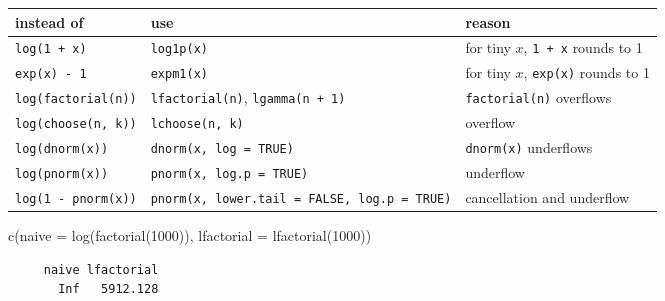 \documentclass[
  letterpaper,
  DIV=11,
  numbers=noendperiod]{scrreprt}
\newenvironment{Shaded}{\begin{snugshade}}{\end{snugshade}}
\newcommand{\AttributeTok}[1]{\textcolor[rgb]{0.40,0.45,0.13}{#1}}
\newcommand{\DecValTok}[1]{\textcolor[rgb]{0.68,0.00,0.00}{#1}}
\newcommand{\FunctionTok}[1]{\textcolor[rgb]{0.28,0.35,0.67}{#1}}
\newcommand{\NormalTok}[1]{\textcolor[rgb]{0.00,0.23,0.31}{#1}}
\newcounter{none} %
\begin{document}
{\def\LTcaptype{none} %
\begin{longtable}[]{@{}
  >{\raggedright\arraybackslash}p{}
  >{\raggedright\arraybackslash}p{}
  >{\raggedright\arraybackslash}p{}@{}}
\toprule\noalign{}
\begin{minipage}[b]{\linewidth}\raggedright
instead of
\end{minipage} & \begin{minipage}[b]{\linewidth}\raggedright
use
\end{minipage} & \begin{minipage}[b]{\linewidth}\raggedright
reason
\end{minipage} \\
\midrule\noalign{}
\endhead
\bottomrule\noalign{}
\endlastfoot
\texttt{log(1\ +\ x)} & \texttt{log1p(x)} & for tiny \(x\),
\texttt{1\ +\ x} rounds to 1 \\
\texttt{exp(x)\ -\ 1} & \texttt{expm1(x)} & for tiny \(x\),
\texttt{exp(x)} rounds to 1 \\
\texttt{log(factorial(n))} & \texttt{lfactorial(n)},
\texttt{lgamma(n\ +\ 1)} & \texttt{factorial(n)} overflows \\
\texttt{log(choose(n,\ k))} & \texttt{lchoose(n,\ k)} & overflow \\
\texttt{log(dnorm(x))} & \texttt{dnorm(x,\ log\ =\ TRUE)} &
\texttt{dnorm(x)} underflows \\
\texttt{log(pnorm(x))} & \texttt{pnorm(x,\ log.p\ =\ TRUE)} &
underflow \\
\texttt{log(1\ -\ pnorm(x))} &
\texttt{pnorm(x,\ lower.tail\ =\ FALSE,\ log.p\ =\ TRUE)} & cancellation
and underflow \\
\end{longtable}
}

\begin{Shaded}
\begin{Highlighting}[]
\FunctionTok{c}\NormalTok{(}\AttributeTok{naive =} \FunctionTok{log}\NormalTok{(}\FunctionTok{factorial}\NormalTok{(}\DecValTok{1000}\NormalTok{)), }\AttributeTok{lfactorial =} \FunctionTok{lfactorial}\NormalTok{(}\DecValTok{1000}\NormalTok{))}
\end{Highlighting}
\end{Shaded}

\begin{verbatim}
     naive lfactorial 
       Inf   5912.128 
\end{verbatim}
\end{document}
